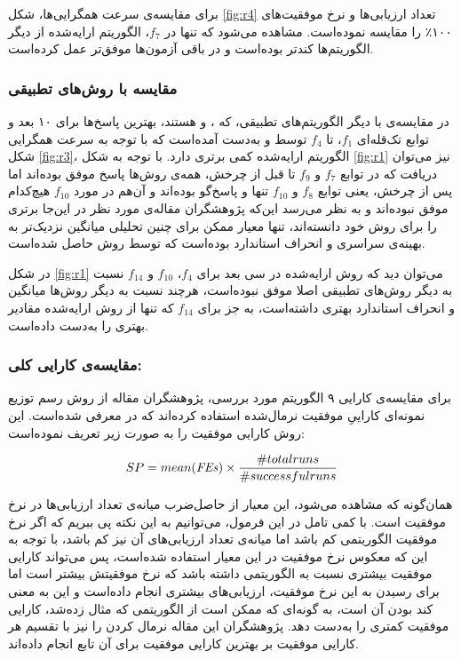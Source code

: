 \documentclass[12pt,a4paper]{article}
\theoremstyle{definition}
\theoremstyle{theorem}
\theoremstyle{definition}
\begin{document}
برای مقایسه‌ی سرعت همگرایی‌ها، شکل \ref{fig:r4} تعداد ارزیابی‌ها و نرخ موفقیت‌های ۱۰۰٪ را مقایسه نموده‌است. مشاهده می‌شود که تنها در 
$f_7$، 
الگوریتم ارایه‌شده از دیگر الگوریتم‌ها کندتر بوده‌است و در باقی آزمون‌ها موفق‌تر عمل‌ کرده‌است. 
\subsubsection{مقایسه‌ با روش‌های تطبیقی}
در مقایسه‌ی 
با دیگر الگوریتم‌های تطبیقی، که 
،
 و 
هستند، بهترین پاسخ‌ها برای ۱۰ بعد و توابع تک‌قله‌ای 
$f_{1}$، 
تا
$f_{4}$
توسط 
و
به‌دست آمده‌است که با توجه به سرعت همگرایی شکل \ref{fig:r3}، الگوریتم ارایه‌شده کمی برتری دارد. با توجه به شکل \ref{fig:r1} نیز می‌توان دریافت که در توابع 
$f_7$
و 
$f_{9}$
تا قبل از چرخش، همه‌ی روش‌ها پاسخ‌ موفق بوده‌اند اما پس از چرخش، یعنی توابع 
$f_8$
و 
$f_{10}$
تنها 
و
پاسخ‌گو بوده‌اند و آن‌هم در مورد $f_{10}$ هیچ‌کدام موفق نبوده‌اند و به نظر می‌رسد این‌که پژوهشگران مقاله‌ی مورد نظر در این‌جا برتری را برای روش خود دانسته‌اند، تنها معیار ممکن برای چنین تحلیلی میانگین نزدیک‌تر به بهینه‌ی سراسری و انحراف استاندارد بوده‌است که توسط روش حاصل شده‌است. 

در شکل \ref{fig:r1} می‌توان دید که روش ارایه‌شده در سی بعد برای 
$f_4$،
$f_{10}$
و 
$f_{14}$
نسبت به دیگر روش‌های تطبیقی اصلا موفق نبوده‌است، هرچند نسبت به دیگر روش‌ها میانگین و انحراف استاندارد بهتری داشته‌است، به جز برای 
$f_{14}$
که تنها 
از روش ارایه‌شده مقادیر بهتری را به‌دست داده‌است. 

\subsubsection{مقایسه‌ی کارایی کلی:}

برای مقایسه‌ی کارایی ۹ الگوریتم مورد بررسی، پژوهشگران مقاله از روش رسم توزیع نمونه‌ای کاراییِ موفقیت نرمال‌شده‌ استفاده کرده‌اند که در \cite{36} معرفی شده‌است. این روش کارایی موفقیت  را به صورت زیر تعریف نموده‌است: 

\begin{equation}
SP = mean(\mathit{FEs}) \times {{\#total runs} \over {\#successful runs}}
\end{equation}

همان‌گونه که مشاهده می‌شود، این معیار از حاصل‌ضرب میانه‌ی تعداد ارزیابی‌ها در نرخ موفقیت است. با کمی تامل در این فرمول، می‌توانیم به این نکته پی ببریم که اگر نرخ موفقیت الگوریتمی کم باشد اما میانه‌ی تعداد ارزیابی‌های آن نیز کم باشد، با توجه به این که معکوس نرخ موفقیت در این معیار استفاده شده‌است، پس می‌تواند کارایی موفقیت بیشتری نسبت به الگوریتمی داشته باشد که نرخ موفقیتش بیشتر است اما برای رسیدن به این نرخ موفقیت، ارزیابی‌های بیشتری انجام داده‌است و این به معنی کند بودن آن است، به گونه‌ای که ممکن است از الگوریتمی که مثال زده‌شد، کارایی موفقیت کمتری را به‌دست دهد. پژوهشگران این مقاله نرمال کردن را نیز با تقسیم هر کارایی موفقیت بر بهترین کارایی موفقیت برای آن تابع انجام داده‌اند. 
\end{document}
